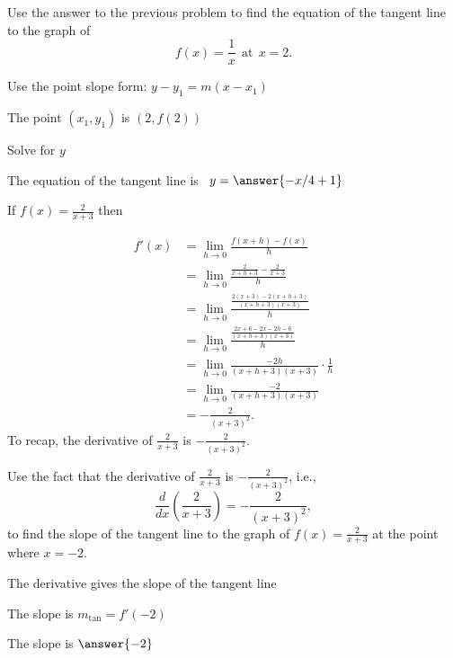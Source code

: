 \documentclass{ximera}
\begin{document}
\begin{problem} %
Use the answer to the previous problem to find the equation of the tangent line to the graph of 
\[
f(x) = \frac{1}{x} \ \ \text{at} \  \ x=2.
\]
\begin{hint}
Use the point slope form: $y-y_1 = m(x-x_1)$
\end{hint}
\begin{hint}
The point $(x_1,y_1)$ is $(2, f(2))$
\end{hint}
\begin{hint}
Solve for $y$
\end{hint}
The equation of the tangent line is \ $y = \answer{-x/4 + 1}$
\end{problem}



\begin{example} %
If $f(x) = \displaystyle{\frac{2}{x+3}}$ then

\begin{align*}
f'(x) &= \lim_{h \to 0} \frac{f(x+h)-f(x)}{h}\\[5pt]
&= \lim_{h \to 0} \frac{\frac{2}{x+h +3}- \frac{2}{x+3}}{h}\\[5pt]
&= \lim_{h \to 0} \frac{\frac{2(x+3) - 2(x+h+3)}{(x+h+3)(x+3)}}{h} \\[5pt]
&= \lim_{h \to 0} \frac{\frac{2x+6 - 2x-2h-6}{(x+h+3)(x+3)}}{h} \\[5pt]
&=  \lim_{h \to 0} \frac{-2h}{(x+h+3)(x+3)}\cdot \frac{1}{h}\\[5pt]
&= \lim_{h \to 0} \frac{-2}{(x+h+3)(x+3)} \\[5pt]
&= -\frac{2}{(x+3)^2}.
\end{align*}
To recap, the derivative of $\displaystyle{\frac{2}{x+3}}$ is $\displaystyle{-\frac{2}{(x+3)^2}}$.
\end{example}


\begin{problem} %
Use the fact that the derivative of $\frac{2}{x+3}$ is $-\frac{2}{(x+3)^2}$,
i.e., 
\[
\frac{d}{dx}\left(\frac{2}{x+3}\right) = -\frac{2}{(x+3)^2},
\]
to find the slope of the tangent line to the graph of 
$f(x) = \frac{2}{x+3}$ at the point where $x = -2$.\\
\begin{hint}
The derivative gives the slope of the tangent line
\end{hint}
\begin{hint}
The slope is $m_{\text{tan}} = f'(-2)$
\end{hint}
The slope is $\answer{-2}$
\end{problem}
\end{document}
